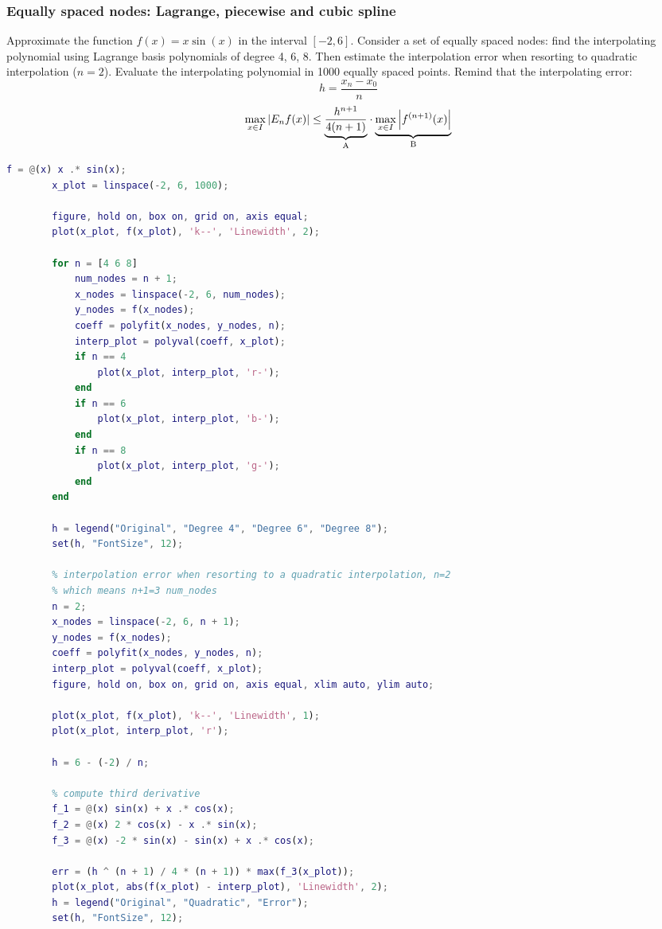     \subsubsection{Equally spaced nodes: Lagrange, piecewise and cubic spline}
        Approximate the function $f(x)=x\sin(x)$ in the interval $[-2,6]$. Consider a set of equally spaced nodes: find the interpolating polynomial using Lagrange basis polynomials of degree 4, 6, 8. Then estimate the interpolation error when resorting to quadratic interpolation ($n=2$). Evaluate the interpolating polynomial in 1000 equally spaced points. Remind that the interpolating error:
        $$
        h=\frac{x_n-x_0}{n}
        $$
        $$
        \max_{x\in I}\left|E_nf(x)\right|
        \leq
        \underlabel{
            \frac{
                h^{n+1}
            }{
                4(n+1)
            }
        }{A}
        \cdot
        \underlabel{
            \max_{x\in I}\left|
                f^{(n+1)}(x)
            \right|
        }{B}
        $$
        \begin{lstlisting}[language=Matlab, escapeinside=`', gobble=8]
        f = @(x) x .* sin(x);
        x_plot = linspace(-2, 6, 1000);
        
        figure, hold on, box on, grid on, axis equal;
        plot(x_plot, f(x_plot), 'k--', 'Linewidth', 2);
        
        for n = [4 6 8]
            num_nodes = n + 1;
            x_nodes = linspace(-2, 6, num_nodes);
            y_nodes = f(x_nodes);
            coeff = polyfit(x_nodes, y_nodes, n);
            interp_plot = polyval(coeff, x_plot);
            if n == 4
                plot(x_plot, interp_plot, 'r-');
            end
            if n == 6
                plot(x_plot, interp_plot, 'b-');
            end
            if n == 8
                plot(x_plot, interp_plot, 'g-');
            end
        end
        
        h = legend("Original", "Degree 4", "Degree 6", "Degree 8");
        set(h, "FontSize", 12);
        
        % interpolation error when resorting to a quadratic interpolation, n=2
        % which means n+1=3 num_nodes
        n = 2;
        x_nodes = linspace(-2, 6, n + 1);
        y_nodes = f(x_nodes);
        coeff = polyfit(x_nodes, y_nodes, n);
        interp_plot = polyval(coeff, x_plot);
        figure, hold on, box on, grid on, axis equal, xlim auto, ylim auto;
        
        plot(x_plot, f(x_plot), 'k--', 'Linewidth', 1);
        plot(x_plot, interp_plot, 'r');
        
        h = 6 - (-2) / n;
        
        % compute third derivative
        f_1 = @(x) sin(x) + x .* cos(x);
        f_2 = @(x) 2 * cos(x) - x .* sin(x);
        f_3 = @(x) -2 * sin(x) - sin(x) + x .* cos(x);
        
        err = (h ^ (n + 1) / 4 * (n + 1)) * max(f_3(x_plot));
        plot(x_plot, abs(f(x_plot) - interp_plot), 'Linewidth', 2);
        h = legend("Original", "Quadratic", "Error");
        set(h, "FontSize", 12);
        \end{lstlisting}
